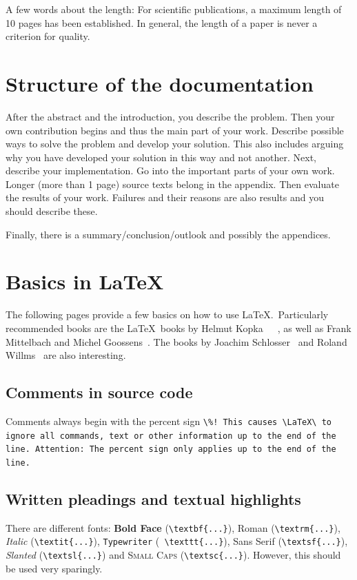 \documentclass{llncs}
\begin{document}
A few words about the length: For scientific publications, a maximum length of 10 pages has been established. In general, the length of a paper is never a criterion for quality.


\section{Structure of the documentation}

After the abstract and the introduction, you describe the problem. 
Then your own contribution begins and thus the main part of your work. Describe possible ways to solve the problem and develop your solution. This also includes arguing why you have developed your solution in this way and not another. Next, describe your implementation. Go into the important parts of your own work. Longer (more than 1 page) source texts belong in the appendix. Then evaluate the results of your work. Failures and their reasons are also results and you should describe these. 

Finally, there is a summary/conclusion/outlook and possibly the appendices. 

\section{Basics in \LaTeX}

The following pages provide a few basics on how to use \LaTeX.~Particularly recommended books are the \LaTeX~books by Helmut Kopka~\cite{LaTeXKopka1}~\cite{LaTeXKopka2}~\cite{LaTeXKopka3}, as well as Frank Mittelbach and Michel Goossens~\cite{LaTeXBegleiter}. The books by Joachim Schlosser~\cite{LaTeXWissenschaftlich} and Roland Willms~\cite{LaTeXSchnelleinsteiger} are also interesting.

\subsection{Comments in source code}

Comments always begin with the percent sign \verb|\%! This causes \LaTeX\ to ignore all commands, text or other information up to the end of the line. Attention: The percent sign only applies up to the end of the line.|

\subsection{Written pleadings and textual highlights}

There are different fonts: \textbf{Bold Face} (\verb!\textbf{...}!), \textrm{Roman} (\verb!\textrm{...}!), \textit{Italic} (\verb!\textit{...}!), \texttt{Typewriter} (\verb! \texttt{...}!), \textsf{Sans Serif} (\verb!\textsf{...}!), \textsl{Slanted} (\verb!\textsl{...}!) and \textsc{Small Caps} (\verb!\textsc{...}!). However, this should be used very sparingly.
\end{document}
